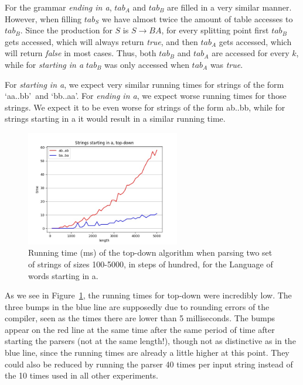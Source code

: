 For the grammar \textit{ending in a}, $tab_A$ and $tab_B$ are filled in a very similar manner.
However, when filling $tab_S$ we have almost twice the amount of table accesses to $tab_B$.
Since the production for $S$ is $S\rightarrow BA$, for every splitting point first $tab_B$ gets accessed, which will always return \textit{true}, and then $tab_A$ gets accessed, which will return \textit{false} in most cases.
Thus, both $tab_B$ and $tab_A$ are accessed for every $k$, while for \textit{starting in a} $tab_B$ was only accessed when $tab_A$ was \textit{true}.

For \textit{starting in a}, we expect very similar running times for strings of the form \lq aa..bb\rq~and \lq bb..aa\rq.
For \textit{ending in a}, we expect worse running times for those strings.
We expect it to be even worse for strings of the form ab..bb, while for strings starting in a it would result in a similar running time.


\begin{figure}[h!]
    \centering
    \includegraphics[width=0.6\textwidth]{Resources/t_sa_td.jpg}
    \caption{Running time (ms) of the top-down algorithm when parsing two set of strings of sizes 100-5000, in steps of hundred, for the Language of words starting in a.}
    \label{fig:t_sa_td}
\end{figure}

As we see in Figure~\ref{fig:t_sa_td}, the running times for top-down were incredibly low.
The three bumps in the blue line are supposedly due to rounding errors of the compiler, seen as the times there are lower than 5 milliseconds.
The bumps appear on the red line at the same time after the same period of time after starting the parsers (not at the same length!), though not as distinctive as in the blue line, since the running times are already a little higher at this point.
They could also be reduced by running the parser 40 times per input string instead of the 10 times used in all other experiments.


